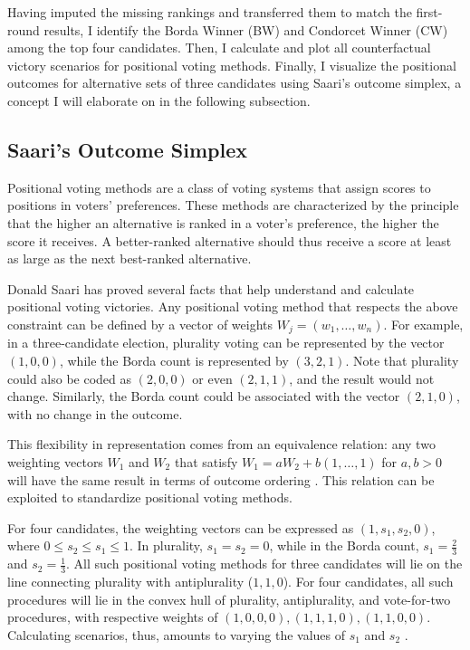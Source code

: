 \documentclass[hidelinks,11pt]{article} \usepackage[utf8]{inputenc}
\begin{document}
Having imputed the missing rankings and transferred them to match the first-round results, I identify the Borda Winner (BW) and Condorcet Winner (CW) among the top four candidates. Then, I calculate and plot all counterfactual victory scenarios for positional voting methods. Finally, I visualize the positional outcomes for alternative sets of three candidates using Saari's outcome simplex, a concept I will elaborate on in the following subsection.

\subsection{Saari's Outcome Simplex}

Positional voting methods are a class of voting systems that assign scores to positions in voters' preferences. These methods are characterized by the principle that the higher an alternative is ranked in a voter's preference, the higher the score it receives. A better-ranked alternative should thus receive a score at least as large as the next best-ranked alternative.

Donald Saari has proved several facts that help understand and calculate positional voting victories. Any positional voting method that respects the above constraint can be defined by a vector of weights \(W_{j} = (w_{1}, \ldots, w_{n})\). For example, in a three-candidate election, plurality voting can be represented by the vector \((1,0,0)\), while the Borda count is represented by \((3,2,1)\). Note that plurality could also be coded as \((2,0,0)\) or even \((2,1,1)\), and the result would not change. Similarly, the Borda count could be associated with the vector \((2,1,0)\), with no change in the outcome.

This flexibility in representation comes from an equivalence relation: any two weighting vectors \(W_{1}\) and \(W_{2}\) that satisfy \(W_{1} = aW_{2} + b(1,\ldots, 1)\) for \(a,b > 0\) will have the same result in terms of outcome ordering \parencite{saari1995basic}. This relation can be exploited to standardize positional voting methods.

For four candidates, the weighting vectors can be expressed as \((1,s_{1},s_{2},0)\), where \(0 \leq s_{2} \leq s_{1} \leq 1\). In plurality, \(s_{1} = s_{2} = 0\), while in the Borda count, \(s_{1} = \frac{2}{3}\) and \(s_{2} = \frac{1}{3}\). All such positional voting methods for three candidates will lie on the line connecting plurality with antiplurality (\(1,1,0\)). For four candidates, all such procedures will lie in the convex hull of plurality, antiplurality, and vote-for-two procedures, with respective weights of \((1,0,0,0), (1,1,1,0), (1,1,0,0)\). Calculating scenarios, thus, amounts to varying the values of \(s_{1}\) and \(s_{2}\)
\parencite{saari1995basic, saari2001chaotic}.
\end{document}
